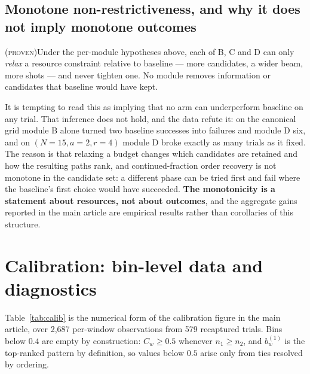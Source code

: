 \documentclass[final,5p,times,longtitle]{elsarticle}
\theoremstyle{plain}
\newcommand{\PROVEN}{\textsc{(proven)}}
\newcommand{\Cw}{C_w}
\begin{document}
\subsection{Monotone non-restrictiveness, and why it does not imply monotone outcomes}
\PROVEN{}\quad Under the per-module hypotheses above, each of B, C and D
can only \emph{relax} a resource constraint relative to baseline --- more
candidates, a wider beam, more shots --- and never tighten one. No module
removes information or candidates that baseline would have kept.

It is tempting to read this as implying that no arm can underperform
baseline on any trial. That inference does not hold, and the data refute
it: on the canonical grid module B alone turned two baseline successes
into failures and module D six, and on $(N{=}15,a{=}2,r{=}4)$ module D
broke exactly as many trials as it fixed. The reason is that relaxing a
budget changes which candidates are retained and how the resulting paths
rank, and continued-fraction order recovery is not monotone in the
candidate set: a different phase can be tried first and fail where the
baseline's first choice would have succeeded. \textbf{The monotonicity is
a statement about resources, not about outcomes}, and the aggregate gains
reported in the main article are empirical results rather than corollaries
of this structure.


\section{Calibration: bin-level data and diagnostics}
\label{si:calib}

Table~\ref{tab:calib} is the numerical form of the calibration figure in
the main article, over 2{,}687 per-window observations from 579
recaptured trials. Bins below $0.4$ are empty by construction:
$\Cw\ge0.5$ whenever $n_1\ge n_2$, and $b^{(1)}_w$ is the top-ranked
pattern by definition, so values below $0.5$ arise only from ties
resolved by ordering.
\end{document}
